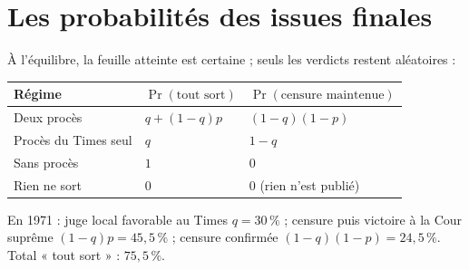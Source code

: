 \documentclass[11pt,a4paper]{article}
\theoremstyle{definition}
\begin{document}
\section{Les probabilités des issues finales}
À l'équilibre, la feuille atteinte est certaine ; seuls les verdicts restent aléatoires :
\begin{center}
\small
\begin{tabular}{@{}lll@{}}
\toprule
Régime & $\Pr(\text{tout sort})$ & $\Pr(\text{censure maintenue})$ \\
\midrule
Deux procès & $q+(1-q)p$ & $(1-q)(1-p)$ \\
Procès du Times seul & $q$ & $1-q$ \\
Sans procès & $1$ & $0$ \\
Rien ne sort & $0$ & $0$ (rien n'est publié) \\
\bottomrule
\end{tabular}
\end{center}
En 1971 : juge local favorable au Times $q=30\,\%$ ; censure puis victoire à la Cour suprême $(1-q)p=45,5\,\%$ ; censure confirmée $(1-q)(1-p)=24,5\,\%$. Total « tout sort » : $75,5\,\%$.
\end{document}
